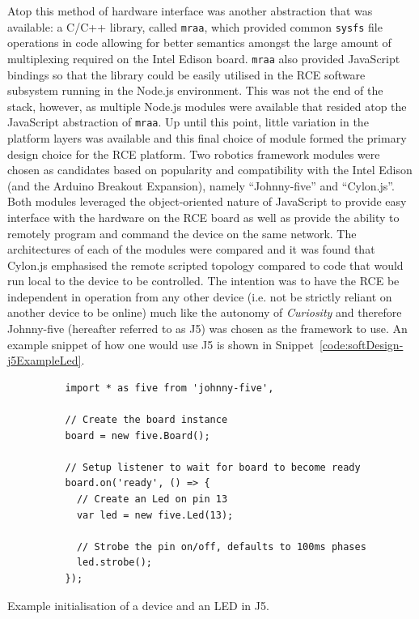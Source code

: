       Atop this method of hardware interface was another abstraction that was available: a C/C++ library, called \texttt{mraa}, which provided common \texttt{sysfs} file operations in code allowing for better semantics amongst the large amount of multiplexing required on the Intel Edison board. \texttt{mraa} also provided JavaScript bindings so that the library could be easily utilised in the RCE software subsystem running in the Node.js environment. This was not the end of the stack, however, as multiple Node.js modules were available that resided atop the JavaScript abstraction of \texttt{mraa}. Up until this point, little variation in the platform layers was available and this final choice of module formed the primary design choice for the RCE platform. Two robotics framework modules were chosen as candidates based on popularity and compatibility with the Intel Edison (and the Arduino Breakout Expansion), namely ``Johnny-five'' and ``Cylon.js''. Both modules leveraged the object-oriented nature of JavaScript to provide easy interface with the hardware on the RCE board as well as provide the ability to remotely program and command the device on the same network. The architectures of each of the modules were compared and it was found that Cylon.js emphasised the remote scripted topology compared to code that would run local to the device to be controlled. The intention was to have the RCE be independent in operation from any other device (i.e. not be strictly reliant on another device to be online) much like the autonomy of \textit{Curiosity} and therefore Johnny-five (hereafter referred to as J5) was chosen as the framework to use. An example snippet of how one would use J5 is shown in Snippet~\ref{code:softDesign-j5ExampleLed}.
      
      \begin{code}
        \begin{verbatim}
          import * as five from 'johnny-five',
          
          // Create the board instance
          board = new five.Board();
          
          // Setup listener to wait for board to become ready
          board.on('ready', () => {
            // Create an Led on pin 13
            var led = new five.Led(13);
          
            // Strobe the pin on/off, defaults to 100ms phases
            led.strobe();
          });
        \end{verbatim}
        \caption{Example initialisation of a device and an LED in J5.}
        \label{code:softDesign-j5ExampleLed}
      \end{code}
      
